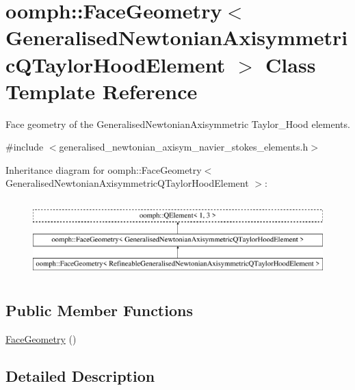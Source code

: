 \hypertarget{classoomph_1_1FaceGeometry_3_01GeneralisedNewtonianAxisymmetricQTaylorHoodElement_01_4}{}\section{oomph\+:\+:Face\+Geometry$<$ Generalised\+Newtonian\+Axisymmetric\+Q\+Taylor\+Hood\+Element $>$ Class Template Reference}
\label{classoomph_1_1FaceGeometry_3_01GeneralisedNewtonianAxisymmetricQTaylorHoodElement_01_4}


Face geometry of the Generalised\+Newtonian\+Axisymmetric Taylor\+\_\+\+Hood elements.  




{\ttfamily \#include $<$generalised\+\_\+newtonian\+\_\+axisym\+\_\+navier\+\_\+stokes\+\_\+elements.\+h$>$}

Inheritance diagram for oomph\+:\+:Face\+Geometry$<$ Generalised\+Newtonian\+Axisymmetric\+Q\+Taylor\+Hood\+Element $>$\+:\begin{figure}[H]
\begin{center}
\leavevmode
\includegraphics[height=3.000000cm]{classoomph_1_1FaceGeometry_3_01GeneralisedNewtonianAxisymmetricQTaylorHoodElement_01_4}
\end{center}
\end{figure}
\subsection*{Public Member Functions}
\begin{DoxyCompactItemize}
\item 
\hyperlink{classoomph_1_1FaceGeometry_3_01GeneralisedNewtonianAxisymmetricQTaylorHoodElement_01_4_ab64448430b6a7a0d22c62287c6e6fe28}{Face\+Geometry} ()
\end{DoxyCompactItemize}


\subsection{Detailed Description}
